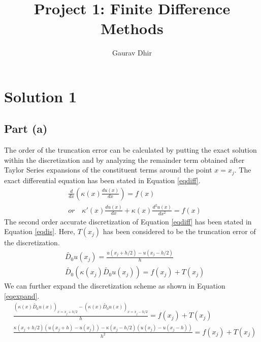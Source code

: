 \documentclass[12pt,dvipsnames]{article}
\newcommand{\an}[1]{{\leavevmode\color{BrickRed}{#1}}}
\begin{document}
\title{Project 1: Finite Difference Methods}
\author{Gaurav Dhir}
\maketitle
\an{You should keep the problem statement in here so that you know what this report is about.}
\section{Solution 1}
\subsection{Part (a)}
The order of the truncation error can be calculated by putting the exact solution within the discretization and by analyzing the remainder term obtained after Taylor Series expansions of the constituent terms around the point $x = x_j$. The exact differential equation has been stated in Equation \ref{eqdiff}. \an{That equation seems to refer to the iterative solver as well, which is not relevant for determining the local truncation error.}
\begin{equation} \label{eqdiff}
    \begin{aligned}
       & \frac{d  }{dx} \left( \kappa(x) \frac{d u(x)}{dx} \right) = f(x)  \\
       & or \quad \kappa'(x)\frac{d u(x)}{dx}+ \kappa(x) \frac{d^2 u(x)}{dx^2} = f(x)
    \end{aligned}
\end{equation}
\an{You should keep the first form above; writing it in the second form makes nontrivial changes both to structure and theory for this PDE.}
The second order accurate discretization of Equation \ref{eqdiff} has been stated in Equation \ref{eqdis}. Here, $T(x_j)$ has been considered to be the truncation error of the discretization. 
\begin{equation} \label{eqdis}
    \begin{aligned}
       & \widetilde{D_0}u(x_j) = \frac{u(x_j + h/2) - u(x_j - h/2)}{h} \\
       & \widetilde{D_0}\left(\kappa(x_j)\widetilde{D_0}u(x_j) \right) = f(x_j) + T(x_j)
    \end{aligned}
\end{equation}
We can further expand the discretization scheme as shown in Equation \ref{eqexpand}.
\begin{equation} \label{eqexpand}
    \begin{aligned}
        & \frac{( \kappa(x) \widetilde{D_0} u(x) )_{x = x_j + h/2} - ( \kappa(x) \widetilde{D_0} u(x) )_{x = x_j - h/2}}{h} = f(x_j) + T(x_j) \\
        & \frac{\kappa(x_j + h/2) \left( u(x_j + h) - u(x_j) \right) - \kappa(x_j - h/2) \left( u(x_j) - u(x_j - h) \right)}{h^2} = f(x_j) + T(x_j)    
    \end{aligned}
\end{equation}
\end{document}
